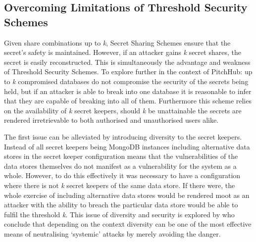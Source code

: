 \subsection{Overcoming Limitations of Threshold Security Schemes}
Given share combinations up to \textit{k}, Secret Sharing Schemes ensure that the secret's safety is maintained. However, if an attacker gains \textit{k} secret shares, the secret is easily reconstructed. This is simultaneously the advantage and weakness of Threshold Security Schemes. To explore further in the context of PitchHub: up to \textit{k} compromised databases do not compromise the security of the secrets being held, but if an attacker is able to break into one database it is reasonable to infer that they are capable of breaking into all of them. Furthermore this scheme relies on the availability of \textit{k} secret keepers, should \textit{k} be unattainable the secrets are rendered irretrievable to both authorised and unauthorised users alike.
\par
The first issue can be alleviated by introducing diversity to the secret keepers. Instead of all secret keepers being MongoDB instances including alternative data stores in the secret keeper configuration means that the vulnerabilities of the data stores themselves do not manifest as a vulnerability for the system as a whole. However, to do this effectively it was necessary to have a configuration where there is not \textit{k} secret keepers of the same data store. If there were, the whole exercise of including alternative data stores would be rendered moot as an attacker with the ability to breach the particular data store would be able to fulfil the threshold \textit{k}. This issue of diversity and security is explored by \citeauthor{littlewood2004redundancy} who conclude that depending on the context diversity can be one of the most effective means of neutralising `systemic' attacks by merely avoiding the danger.
\par
